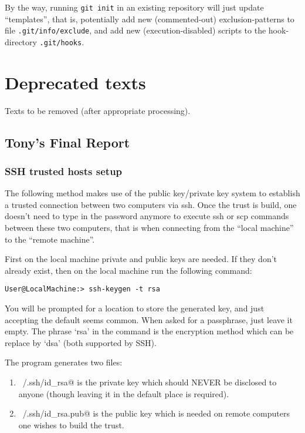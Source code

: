\documentclass{book}
\newcommand{\filename}[1]{\texttt{#1}}
\begin{document}
By the way, running \texttt{git init} in an existing repository will just update ``templates'', that is, potentially add new (commented-out) exclusion-patterns to file \filename{.git/info/exclude}, and add new (execution-disabled) scripts to the hook-directory \filename{.git/hooks}.



\part{Deprecated texts}
\label{par:Deprecatedtexts}

Texts to be removed (after appropriate processing).


\chapter{Tony's Final Report}
\label{cha:finalreport}

\section{SSH trusted hosts setup}
\label{sec:finalreportssh}

The following method makes use of the public key/private key system to establish a trusted connection between two computers via ssh. Once the trust is build, one doesn't need to type in the password anymore to execute ssh or scp commands between these two computers, that is when connecting from the ``local machine'' to the ``remote machine''.

First on the local machine private and public keys are needed. If they don't already exist, then on the local machine run the following command:

\verb!User@LocalMachine:> ssh-keygen -t rsa!

You will be prompted for a location to store the generated key, and just accepting the default seems common. When asked for a passphrase, just leave it empty. The phrase `rsa' in the command is the encryption method which can be replace by `dsa' (both supported by SSH).

The program generates two files:
\begin{enumerate}
\item \verb@~/.ssh/id_rsa@ is the private key which should NEVER be disclosed to anyone (though leaving it in the default place is required).
\item \verb@~/.ssh/id_rsa.pub@ is the public key which is needed on remote computers one wishes to build the trust.
\end{enumerate}
\end{document}
